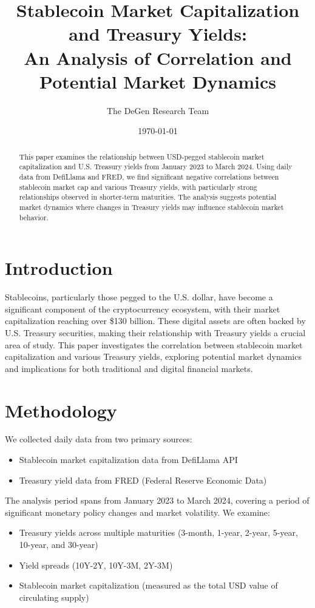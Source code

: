 \documentclass[12pt,a4paper]{article}
\title{Stablecoin Market Capitalization and Treasury Yields:\\
An Analysis of Correlation and Potential Market Dynamics}
\author{The DeGen Research Team}
\date{\today}
\begin{document}
\maketitle

\begin{abstract}
This paper examines the relationship between USD-pegged stablecoin market capitalization and U.S. Treasury yields from January 2023 to March 2024. Using daily data from DefiLlama and FRED, we find significant negative correlations between stablecoin market cap and various Treasury yields, with particularly strong relationships observed in shorter-term maturities. The analysis suggests potential market dynamics where changes in Treasury yields may influence stablecoin market behavior.
\end{abstract}

\section{Introduction}
Stablecoins, particularly those pegged to the U.S. dollar, have become a significant component of the cryptocurrency ecosystem, with their market capitalization reaching over \$130 billion. These digital assets are often backed by U.S. Treasury securities, making their relationship with Treasury yields a crucial area of study. This paper investigates the correlation between stablecoin market capitalization and various Treasury yields, exploring potential market dynamics and implications for both traditional and digital financial markets.

\section{Methodology}
We collected daily data from two primary sources:
\begin{itemize}
    \item Stablecoin market capitalization data from DefiLlama API
    \item Treasury yield data from FRED (Federal Reserve Economic Data)
\end{itemize}

The analysis period spans from January 2023 to March 2024, covering a period of significant monetary policy changes and market volatility. We examine:
\begin{itemize}
    \item Treasury yields across multiple maturities (3-month, 1-year, 2-year, 5-year, 10-year, and 30-year)
    \item Yield spreads (10Y-2Y, 10Y-3M, 2Y-3M)
    \item Stablecoin market capitalization (measured as the total USD value of circulating supply)
\end{itemize}
\end{document}
